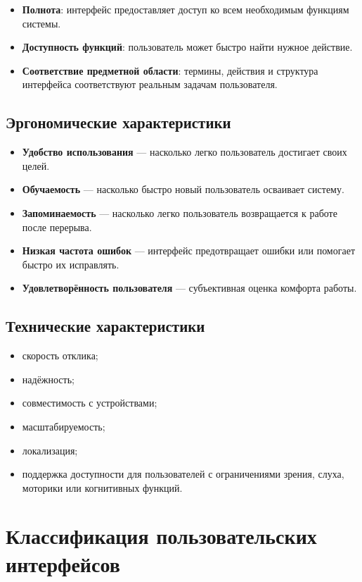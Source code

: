 \documentclass[12pt,a4paper]{article}
\begin{document}
\begin{itemize}
    \item \textbf{Полнота}: интерфейс предоставляет доступ ко всем необходимым функциям системы.
    \item \textbf{Доступность функций}: пользователь может быстро найти нужное действие.
    \item \textbf{Соответствие предметной области}: термины, действия и структура интерфейса соответствуют реальным задачам пользователя.
\end{itemize}

\subsection{Эргономические характеристики}

\begin{itemize}
    \item \textbf{Удобство использования} --- насколько легко пользователь достигает своих целей.
    \item \textbf{Обучаемость} --- насколько быстро новый пользователь осваивает систему.
    \item \textbf{Запоминаемость} --- насколько легко пользователь возвращается к работе после перерыва.
    \item \textbf{Низкая частота ошибок} --- интерфейс предотвращает ошибки или помогает быстро их исправлять.
    \item \textbf{Удовлетворённость пользователя} --- субъективная оценка комфорта работы.
\end{itemize}

\subsection{Технические характеристики}

\begin{itemize}
    \item скорость отклика;
    \item надёжность;
    \item совместимость с устройствами;
    \item масштабируемость;
    \item локализация;
    \item поддержка доступности для пользователей с ограничениями зрения, слуха, моторики или когнитивных функций.
\end{itemize}

\section{Классификация пользовательских интерфейсов}
\end{document}
